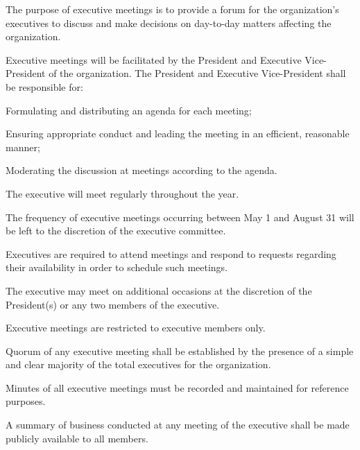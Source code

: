 \documentclass[12pt,a4paper]{article}
\begin{document}
\begin{constitutionlist}
\item The purpose of executive meetings is to provide a forum for the organization's executives to discuss and make decisions on day-to-day matters affecting the organization.

\item Executive meetings will be facilitated by the President and Executive Vice-President of the organization. The President and Executive Vice-President shall be responsible for:

\begin{constitutionlist}
\item Formulating and distributing an agenda for each meeting;

\item Ensuring appropriate conduct and leading the meeting in an efficient, reasonable manner;

\item Moderating the discussion at meetings according to the agenda.
\end{constitutionlist}

\item The executive will meet regularly throughout the year.

\item The frequency of executive meetings occurring between May 1 and August 31 will be left to the discretion of the executive committee.

\item Executives are required to attend meetings and respond to requests regarding their availability in order to schedule such meetings.

\item The executive may meet on additional occasions at the discretion of the President(s) or any two members of the executive.

\item Executive meetings are restricted to executive members only.

\item Quorum of any executive meeting shall be established by the presence of a simple and clear majority of the total executives for the organization.

\item Minutes of all executive meetings must be recorded and maintained for reference purposes.

\item A summary of business conducted at any meeting of the executive shall be made publicly available to all members.


\end{constitutionlist}
\end{document}

